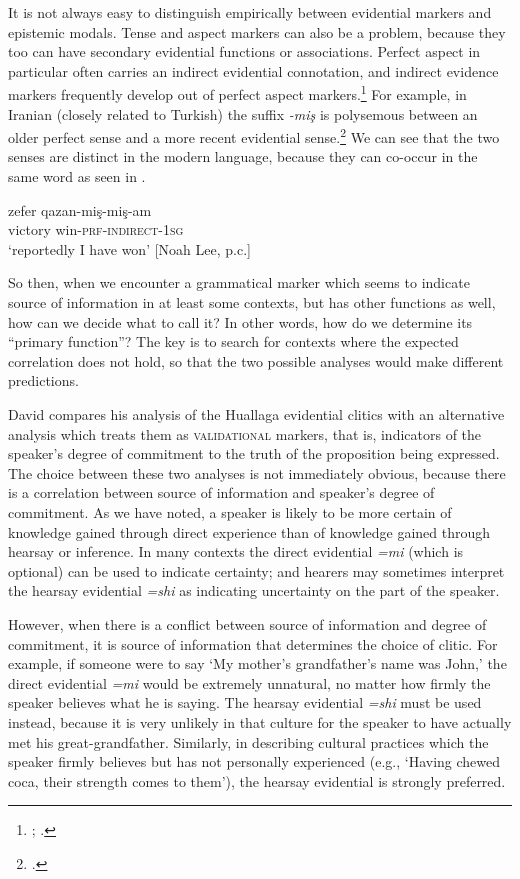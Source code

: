 It is not always easy to distinguish empirically between evidential markers and epistemic modals. Tense and aspect markers can also be a problem, because they too can have secondary evidential functions or associations. Perfect aspect in particular often carries an indirect evidential connotation, and indirect evidence markers frequently develop out of perfect aspect markers.\footnote{\citet{Izvorski1997}; \citet{BybeeEtAl1994}.} For example, in Iranian   (closely related to  {Turkish}) the suffix \textit{-miş} is polysemous between an older perfect sense and a more recent evidential sense.\footnote{\citet{Lee2008}.} We can see that the two senses are distinct in the modern language, because they can co-occur in the same word as seen in .


\ea \label{ex:17.5}
\gll zefer  qazan-miş-miş-am\\
victory  win-\textsc{prf}-\textsc{indirect-1sg}\\
\glt ‘reportedly I have won’  [Noah Lee, p.c.]
\z


So then, when we encounter a grammatical marker which seems to indicate source of information in at least some contexts, but has other functions as well, how can we decide what to call it? In other words, how do we determine its “primary function”? The key is to search for contexts where the expected correlation does not hold, so that the two possible analyses would make different predictions.



David \citet[421ff.]{Weber1989} compares his analysis of the Huallaga  evidential clitics with an alternative analysis which treats them as \textsc{validational} markers, that is, indicators of the speaker’s degree of commitment to the truth of the proposition being expressed. The choice between these two analyses is not immediately obvious, because there is a correlation between source of information and speaker’s degree of commitment. As we have noted, a speaker is likely to be more certain of knowledge gained through direct experience than of knowledge gained through hearsay or inference. In many contexts the direct evidential \textit{=mi} (which is optional) can be used to indicate certainty; and hearers may sometimes interpret the hearsay evidential \textit{=shi} as indicating uncertainty on the part of the speaker.



However, when there is a conflict between source of information and degree of commitment, it is source of information that determines the choice of clitic. For example, if someone were to say ‘My mother’s grandfather’s name was John,’ the direct evidential \textit{=mi} would be extremely unnatural, no matter how firmly the speaker believes what he is saying. The hearsay evidential \textit{=shi} must be used instead, because it is very unlikely in that culture for the speaker to have actually met his great-grandfather. Similarly, in describing cultural practices which the speaker firmly believes but has not personally experienced (e.g., ‘Having chewed coca, their strength comes to them’), the hearsay evidential is strongly preferred.



